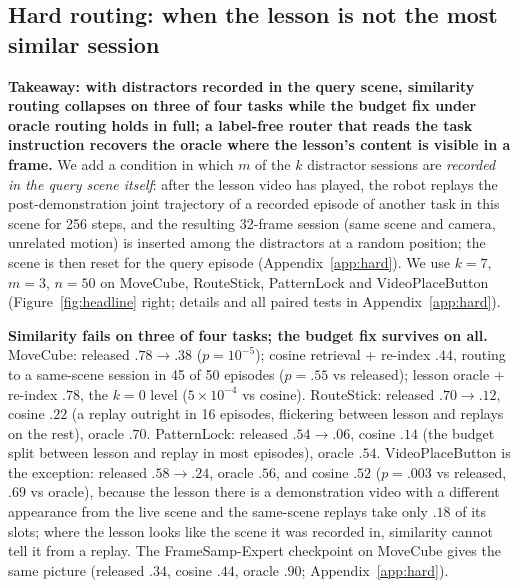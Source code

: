 \documentclass{article}
\begin{document}
\subsection{Hard routing: when the lesson is not the most similar session}
\label{sec:hard}


\textbf{Takeaway: with distractors recorded in the query scene, similarity routing collapses on three of four tasks while the budget fix under oracle routing holds in full; a label-free router that reads the task instruction recovers the oracle where the lesson's content is visible in a frame.} We add a condition in which $m$ of the $k$ distractor sessions are \emph{recorded in the query scene itself}: after the lesson video has played, the robot replays the post-demonstration joint trajectory of a recorded episode of another task in this scene for 256 steps, and the resulting 32-frame session (same scene and camera, unrelated motion) is inserted among the distractors at a random position; the scene is then reset for the query episode (Appendix~\ref{app:hard}). We use $k{=}7$, $m{=}3$, $n{=}50$ on MoveCube, RouteStick, PatternLock and VideoPlaceButton (Figure~\ref{fig:headline} right; details and all paired tests in Appendix~\ref{app:hard}).

\textbf{Similarity fails on three of four tasks; the budget fix survives on all.} MoveCube: released $.78\to.38$ ($p=10^{-5}$); cosine retrieval + re-index $.44$, routing to a same-scene session in 45 of 50 episodes ($p=.55$ vs released); lesson oracle + re-index $.78$, the $k{=}0$ level ($5\times10^{-4}$ vs cosine). RouteStick: released $.70\to.12$, cosine $.22$ (a replay outright in 16 episodes, flickering between lesson and replays on the rest), oracle $.70$. PatternLock: released $.54\to.06$, cosine $.14$ (the budget split between lesson and replay in most episodes), oracle $.54$. VideoPlaceButton is the exception: released $.58\to.24$, oracle $.56$, and cosine $.52$ ($p=.003$ vs released, $.69$ vs oracle), because the lesson there is a demonstration video with a different appearance from the live scene and the same-scene replays take only $.18$ of its slots; where the lesson looks like the scene it was recorded in, similarity cannot tell it from a replay. The FrameSamp-Expert checkpoint on MoveCube gives the same picture (released $.34$, cosine $.44$, oracle $.90$; Appendix~\ref{app:hard}).
\end{document}
